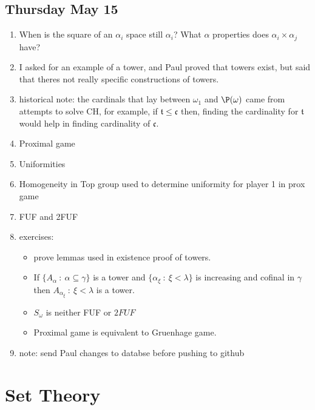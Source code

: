 \documentclass{article}
\begin{document}
\subsection*{Thursday May 15}
\begin{enumerate}
    \item When is the square of an \(\alpha_i\) space still \(\alpha_i\)? What \(\alpha\) properties does \(\alpha_i \times \alpha_j\) have?
    \item I asked for an example of a tower, and Paul proved that towers exist, but said that theres not really specific constructions of towers.
    \item historical note: the cardinals that lay between \(\omega_1\) and \(\P(\omega)\) came from attempts to solve CH, for example, if \(\mathfrak{t} \leq \mathfrak{c}\) then, finding the cardinality for \(\mathfrak{t}\) would help in finding cardinality of \(\mathfrak{c}\).
    \item Proximal game
    \item Uniformities
    \item Homogeneity in Top group used to determine uniformity for player 1 in prox game
    \item FUF and 2FUF
    \item exercises:
    \begin{itemize}
        \item prove lemmas used in existence proof of towers.
        \item If \(\{A_{\alpha} \: : \: \alpha \subseteq \gamma \}\) is a tower and \(\{\alpha_{\xi} \: : \: \xi < \lambda\}\) is increasing and cofinal in \(\gamma\) then \(A_{\alpha_\xi} \: : \: \xi < \lambda\) is a tower.
        \item \(S_{\omega}\) is neither FUF or \(2FUF\)
        \item Proximal game is equivalent to Gruenhage game.
    \end{itemize}
    \item note: send Paul changes to databse before pushing to github
\end{enumerate}

\section{Set Theory}
\end{document}
